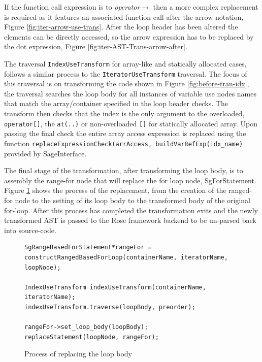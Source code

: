 \documentclass[bsc,frontabs,singlespacing,twoside,parskip,deptreport]{infthesis}
\begin{document}
If the function call expression is to \textit{operator$\rightarrow$} then a more complex replacement is required as it features an associated function call after the arrow notation, Figure \ref{fig:iter-arrow-use-trans}. After the loop header has been altered the elements can be directly accessed, so the arrow expression has to be replaced by the dot expression, Figure \ref{fig:iter-AST-Trans-arrow-after}. 

The traversal \texttt{IndexUseTransform} for array-like and statically allocated cases, follows a similar process to the \texttt{IteratorUseTransform} traversal. The focus of this traversal is on transforming the code shown in Figure \ref{fig:before-tran-idx}, the traversal searches the loop body for all instances of variable use nodes names that match the array/container specified in the loop header checks. The transform then checks that the index is the only argument to the overloaded, \texttt{operator[]}, the \texttt{at(..)} or non-overloaded \texttt{[]} for statically allocated array. Upon passing the final check the entire array access expression  is replaced using the function \texttt{replaceExpressionCheck(arrAccess, buildVarRefExp(idx\_name)} provided by SageInterface.

The final stage of the transformation, after transforming the loop body, is to assembly the range-for node that will replace the for loop node, SgForStatement. Figure \ref{fig:replacing-for-loop-node} shows the process of the replacement, from the creation of the ranged-for node to the setting of its loop body to the transformed body of the original for-loop. After this process has completed the transformation exits and the newly transformed AST is passed to the Rose framework backend to be un-parsed back into source-code.

\begin{figure}[H]
    \centering
    \begin{verbatim}
SgRangeBasedForStatement*rangeFor =
constructRangedBasedForLoop(containerName, iteratorName, loopNode);

IndexUseTransform indexUseTransform(containerName, iteratorName);
indexUseTransform.traverse(loopBody, preorder);

rangeFor->set_loop_body(loopBody);
replaceStatement(loopNode, rangeFor);
    \end{verbatim}
    \caption{Process of replacing the loop body}
    \label{fig:replacing-for-loop-node}
\end{figure}
\end{document}
